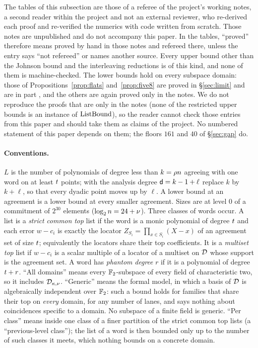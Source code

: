The tables of this subsection are those of a referee of the project's working notes, a second reader within the project and not an external reviewer, who re-derived each proof and re-verified the numerics with code written from scratch. Those notes are unpublished and do not accompany this paper. In the tables, ``proved'' therefore means proved by hand in those notes and refereed there, unless the entry says ``not refereed'' or names another source. Every upper bound other than the Johnson bound and the interleaving reductions is of this kind, and none of them is machine-checked. The lower bounds hold on every subspace domain: those of Propositions~\ref{prop:flats} and~\ref{prop:five8} are proved in \S\ref{sec:limit} and are in part \stmc{}, and the others are again proved only in the notes. We do not reproduce the proofs that are only in the notes (none of the restricted upper bounds is an instance of $\mathrm{ListBound}$), so the reader cannot check those entries from this paper and should take them as claims of the project. No numbered statement of this paper depends on them; the floors $161$ and $40$ of \S\ref{sec:gap} do.

\paragraph{Conventions.} $L$ is the number of polynomials of degree less than $k=\rho n$ agreeing with one word on at least $t$ points; with the analysis degree $\mathsf{d}=k-1+\ell$ replace $k$ by $k+\ell$, so that every dyadic point moves up by $\ell$. A lower bound at an agreement is a lower bound at every smaller agreement. Sizes are at level $0$ of a commitment of $2^{30}$ elements ($\log_2n=24+\nu$). Three classes of words occur. A list is a \emph{strict common top} list if the word is a monic polynomial of degree $t$ and each error $w-c_i$ is exactly the locator $Z_{S_i}=\prod_{x\in S_i}(X-x)$ of an agreement set of size $t$; equivalently the locators share their top coefficients. It is a \emph{multiset top} list if $w-c_i$ is a scalar multiple of a locator of a multiset on $\mathcal{D}$ whose support is the agreement set. A word has \emph{phantom degree} $r$ if it is a polynomial of degree $t+r$. ``All domains'' means every $\mathbb{F}_2$-subspace of every field of characteristic two, so it includes $\mathcal{D}_{\kappa,\nu}$. ``Generic'' means the formal model, in which a basis of $\mathcal{D}$ is algebraically independent over $\mathbb{F}_2$: such a bound holds for families that share their top on \emph{every} domain, for any number of lanes, and says nothing about coincidences specific to a domain. No subspace of a finite field is generic. ``Per class'' means inside one class of a finer partition of the strict common top lists (a ``previous-level class''); the list of a word is then bounded only up to the number of such classes it meets, which nothing bounds on a concrete domain.

